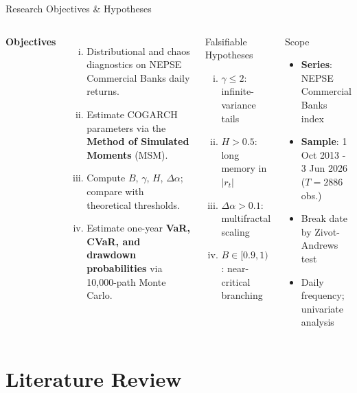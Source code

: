 \documentclass[10pt, aspectratio=169]{beamer}
\begin{document}
\begin{frame}{Research Objectives \& Hypotheses}
\begin{columns}[T]
  \textbf{Objectives}
  \begin{enumerate}[(i)]
    \item Distributional and chaos diagnostics on NEPSE Commercial
          Banks daily returns.
    \item Estimate COGARCH parameters via the
          \textbf{Method of Simulated Moments} (MSM).
    \item Compute $B$, $\gamma$, $H$, $\Delta\alpha$; compare
          with theoretical thresholds.
    \item Estimate one-year \textbf{VaR, CVaR, and drawdown
          probabilities} via 10,000-path Monte Carlo.
  \end{enumerate}
  \begin{block}{Falsifiable Hypotheses}
    \begin{enumerate}[(i)]\small
      \item $\gamma \le 2$: infinite-variance tails
      \item $H > 0.5$: long memory in $|r_t|$
      \item $\Delta\alpha > 0.1$: multifractal scaling
      \item $B \in [0.9,1)$: near-critical branching
    \end{enumerate}
  \end{block}
  \vspace{0.2cm}
  \begin{block}{Scope}
    \begin{itemize}\small
      \item \textbf{Series}: NEPSE Commercial Banks index
      \item \textbf{Sample}: 1 Oct 2013 - 3 Jun 2026
            ($T = 2886$ obs.)
      \item Break date by Zivot-Andrews test
      \item Daily frequency; univariate analysis
    \end{itemize}
  \end{block}
\end{columns}
\end{frame}

\section{Literature Review}
\end{document}
